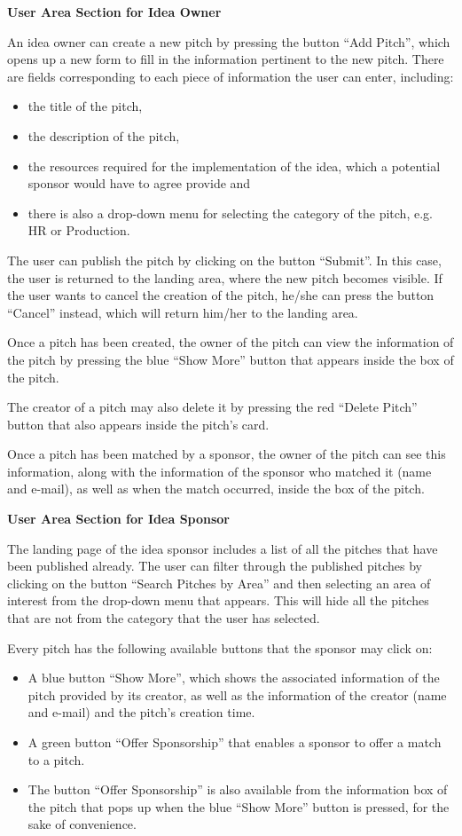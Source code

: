 \textbf{User Area Section for Idea Owner}

An idea owner can create a new pitch by pressing the button “Add Pitch”, which opens up a new form to fill in the information pertinent to the new pitch. There are fields corresponding to each piece of information the user can enter, including:

\begin{itemize}
\item the title of the pitch,
\item the description of the pitch,
\item the resources required for the implementation of the idea, which a potential sponsor would have to agree provide and
\item there is also a drop-down menu for selecting the category of the pitch, e.g. HR or Production.
\end{itemize}

The user can publish the pitch by clicking on the button “Submit”. In this case, the user is returned to the landing area, where the new pitch becomes visible.
If the user wants to cancel the creation of the pitch, he/she can press the button “Cancel” instead, which will return him/her to the landing area.

Once a pitch has been created, the owner of the pitch can view the information of the pitch by pressing the blue “Show More” button that appears inside the box of the pitch.

The creator of a pitch may also delete it by pressing the red “Delete Pitch” button that also appears inside the pitch’s card.

Once a pitch has been matched by a sponsor, the owner of the pitch can see this information, along with the information of the sponsor who matched it (name and e-mail), as well as when the match occurred, inside the box of the pitch.


\textbf{User Area Section for Idea Sponsor}

The landing page of the idea sponsor includes a list of all the pitches that have been published already.
The user can filter through the published pitches by clicking on the button “Search Pitches by Area” and then selecting an area of interest from the drop-down menu that appears. This will hide all the pitches that are not from the category that the user has selected.

Every pitch has the following available buttons that the sponsor may click on:

\begin{itemize}
\item A blue button “Show More”, which shows the associated information of the pitch provided by its creator, as well as the information of the creator (name and e-mail) and the pitch’s creation time.
\item A green button “Offer Sponsorship” that enables a sponsor to offer a match to a pitch.
\item The button “Offer Sponsorship” is also available from the information box of the pitch that pops up when the blue “Show More” button is pressed, for the sake of convenience.
\end{itemize}

